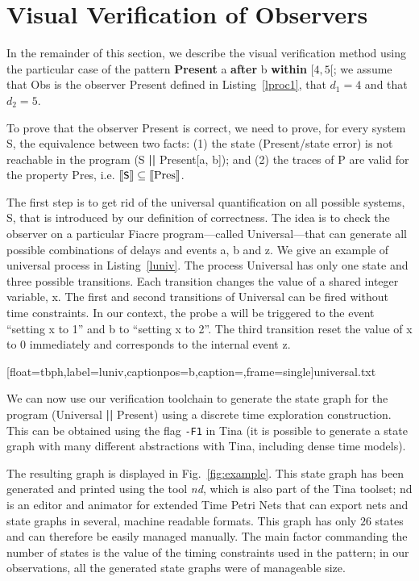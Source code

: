 \documentclass[a4paper]{scrartcl}
\def\code#1{\textsf{\small\bfseries #1}}
\def\vars#1{\textsf{\small #1}}
\newcommand{\sem}[1]{[\kern-.5mm[{#1}]\kern-.5mm]}
\begin{document}
\section{Visual Verification of Observers}
\label{sec 4:patterns verification}

In the remainder of this section, we describe the visual verification
method using the particular case of the pattern \code{Present}
\vars{a} \code{after} \vars{b} \code{within} $[4, 5[$; we assume that
\vars{Obs} is the observer \vars{Present} defined in
Listing~\ref{lproc1}, that $d_1 = 4$ and that $d_2 = 5$. 

To prove that the observer \vars{Present} is correct, we need to
prove, for every system \vars{S}, the equivalence between two facts:
(1) the state \vars{(Present/state error)} is not reachable in the
program (\vars{S} \code{||} \vars{Present[a, b]}); and (2) the traces
of \vars{P} are valid for the property Pres, i.e. $\sem{\vars{S}}
\subseteq \sem{\mathrm{Pres}}$.

The first step is to get rid of the universal quantification on all
possible systems, \vars{S}, that is introduced by our definition of
correctness. The idea is to check the observer on a particular Fiacre
program---called \vars{Universal}---that can generate all possible
combinations of delays and events \vars{a}, \vars{b} and \vars{z}.  We
give an example of universal process in Listing~\ref{luniv}.
The process \vars{Universal} has only one state and three possible
transitions. Each transition changes the value of a shared integer
variable, \vars{x}. The first and second transitions of
\vars{Universal} can be fired without time constraints. In our
context, the probe \vars{a} will be triggered to the event ``setting
\vars{x} to 1'' and \vars{b} to ``setting \vars{x} to 2''. The third
transition reset the value of \vars{x} to 0 immediately and
corresponds to the internal event \vars{z}.

{
  [float=tbph,label=luniv,captionpos=b,caption=,frame=single]{universal.txt}}


We can now use our verification toolchain to generate the state graph
for the program (\vars{Universal} \code{||} \vars{Present}) using a
discrete time exploration construction. This can be obtained using the
flag \texttt{-F1} in {Tina} (it is possible to generate a state
graph with many different abstractions with Tina, including dense time
models).

The resulting graph is displayed in Fig.~\ref{fig:example}.  This
state graph has been generated and printed using the tool \emph{nd},
which is also part of the Tina toolset; nd is an editor and animator
for extended Time Petri Nets that can export nets and state graphs in
several, machine readable formats. This graph has only $26$ states and
can therefore be easily managed manually. The main factor commanding
the number of states is the value of the timing constraints used in
the pattern; in our observations, all the generated state graphs were
of manageable size.
\end{document}
